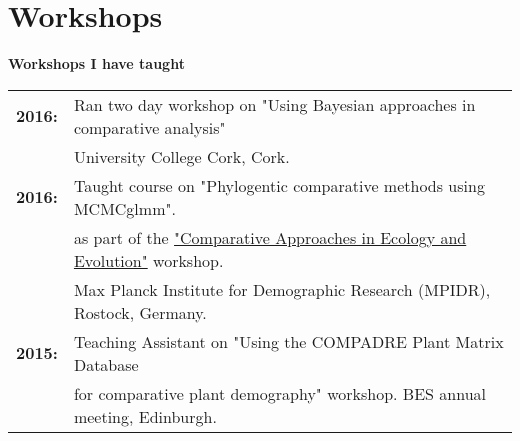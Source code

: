 \documentclass[10pt,a4paper]{article}
\begin{document}
\section{Workshops}
\raggedright\textbf{Workshops I have taught}\\
\begin{tabular}{ll}
\textbf{2016:} & Ran two day workshop on "Using Bayesian approaches in comparative analysis"\\
&University College Cork, Cork.\\
\textbf{2016:} & Taught course on "Phylogentic comparative methods using MCMCglmm".\\
& as part of the \href{http://www.demogr.mpg.de/En/education_career/international_advanced_studies_in_demography_3279/past_courses_3280/comparative_approaches_in_ecology_and_evolution_4708/default.htm}{"Comparative Approaches in Ecology and Evolution"} workshop.\\
& Max Planck Institute for Demographic Research (MPIDR), Rostock, Germany.\\
\textbf{2015:} & Teaching Assistant on "Using the COMPADRE Plant Matrix Database\\
& for comparative plant demography" workshop. BES annual meeting, Edinburgh.\\
\end{tabular}
\end{document}
